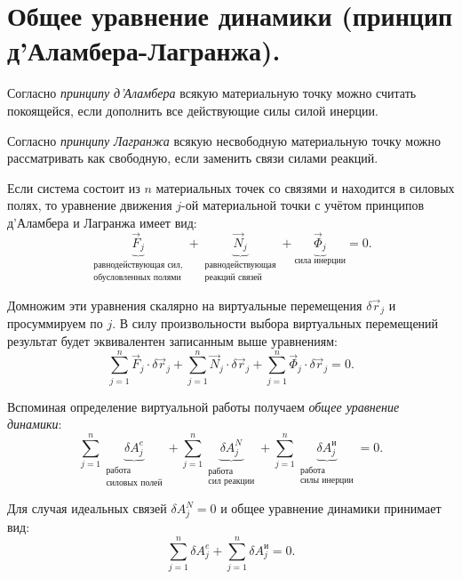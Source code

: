 \chapter{Общее уравнение динамики (принцип д'Аламбера-Лагранжа).}

Согласно \textit{принципу д'Аламбера} всякую материальную точку можно считать
покоящейся, если дополнить все действующие силы силой инерции.

Согласно  \textit{принципу Лагранжа} всякую несвободную материальную точку
можно рассматривать как свободную, если заменить связи силами реакций.

Если система состоит из \( n \) материальных точек со связями и находится в
силовых полях, то уравнение движения \( j \)-ой материальной точки с учётом
принципов д'Аламбера и Лагранжа имеет вид:
\[
    \underbrace{\vec{F}_{j}}_{
        \substack{\textbf{равнодействующая сил,} \\
        \textbf{обусловленных полями}}}
    + 
    \underbrace{\vec{N}_{j} }_{
            \substack{\textbf{равнодействующая} \\ \textbf{реакций связей}}
            }
    +
    \underbrace{\vec{\Phi}_{j}}_{
            \textbf{сила инерции}
            }   
    = 0.
\]

Домножим эти уравнения скалярно на виртуальные перемещения
\( \delta\vec{r}_{j} \) и просуммируем по \( j \). В силу произвольности выбора
виртуальных перемещений результат будет эквивалентен записанным выше
уравнениям:
\[
    \sum\limits_{j=1}^n \vec{F}_{j}\cdot\delta\vec{r}_{j}+
    \sum\limits_{j=1}^n \vec{N}_{j}\cdot\delta\vec{r}_{j}+
    \sum\limits_{j=1}^n \vec{\Phi}_{j}\cdot\delta\vec{r}_{j}
    = 0.
\]  
    
Вспоминая определение виртуальной работы получаем
\emph{общее уравнение динамики}:
\[
    \sum\limits_{j=1}^n \underbrace{\delta A^e_j}_{
        \substack{\textbf{работа} \\ \textbf{силовых полей}}    
        }
    + 
    \sum\limits_{j=1}^n\underbrace{ \delta A^N_j}_{
            \substack{\textbf{работа} \\ \textbf{сил реакции}}
            }
    +
    \sum\limits_{j=1}^n\underbrace{ \delta A^\text{и}_j}_{
            \substack{\textbf{работа} \\ \textbf{силы инерции}}
            }   
    = 0.
\]

Для случая идеальных связей \( \delta A^N_j = 0 \) и общее уравнение динамики
принимает вид:
\[
    \sum\limits_{j=1}^n \delta A^e_j +
    \sum\limits_{j=1}^n \delta A^\text{и}_j
    =0.
\]

\newpage %
